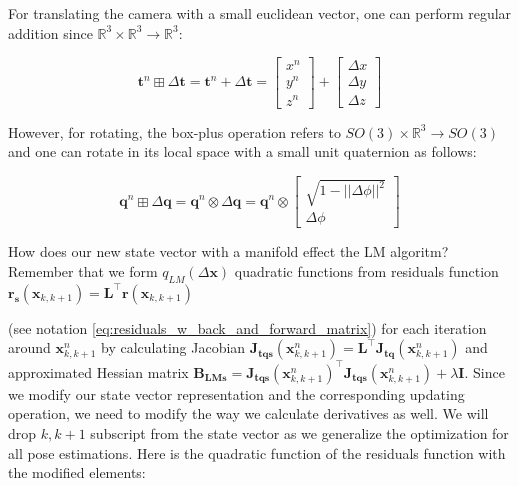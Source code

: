 \documentclass[a4paper]{report}
\numberwithin{figure}{section}
\newcommand{\R}{\mathbb{R}}
\begin{document}
\begin{appendices}
For translating the camera with a small euclidean vector, 
one can perform regular addition since $\R^3 \times \R^3 \rightarrow \R^3$:

\begin{equation}
  \mathbf{t}^n \boxplus \Delta \mathbf{t} = 
  \mathbf{t}^n + \Delta \mathbf{t} =
  \begin{bmatrix} x^{n} \\ y^{n} \\ z^{n} \end{bmatrix} + 
  \begin{bmatrix} \Delta x \\ \Delta y \\ \Delta z \end{bmatrix}
\end{equation}

However, for rotating, the box-plus operation refers to 
$SO(3) \times \R^3 \rightarrow SO(3)$ and one can rotate in its local space 
with a small unit quaternion as follows:

\begin{equation}
  \mathbf{q}^n \boxplus \Delta \mathbf{q} = 
  \mathbf{q}^n \otimes \Delta \mathbf{q} = 
  \mathbf{q}^n \otimes 
  \begin{bmatrix} \sqrt{1-||\Delta \phi||^2} \\ \Delta \phi \end{bmatrix}
\end{equation}

How does our new state vector with a manifold effect the LM algoritm? 
Remember that we form $q_{LM}(\Delta \mathbf{x})$ quadratic functions 
from residuals function 
$\mathbf{r_s}(\mathbf{x}_{k,k+1})=\mathbf{L}^\top\mathbf{r}(\mathbf{x}_{k,k+1})$
 
(see notation \eqref{eq:residuals_w_back_and_forward_matrix})
for each iteration around $\mathbf{x}^n_{k,k+1}$ by calculating Jacobian 
$\mathbf{J_{tqs}}(\mathbf{x}^n_{k,k+1})=\mathbf{L}^\top\mathbf{J_{tq}}(\mathbf{x}^n_{k,k+1})$
and 
approximated Hessian matrix 
$\mathbf{B_{LMs}}=\mathbf{J_{tqs}}(\mathbf{x}^n_{k,k+1})^\top\mathbf{J_{tqs}}(\mathbf{x}^n_{k,k+1})
 + \lambda \mathbf{I}$.
Since we modify our state vector representation 
and the corresponding updating operation, we need to modify the way we calculate 
derivatives as well. We will drop $k,k+1$ subscript from the state vector 
as we generalize the 
optimization for all pose estimations. 
Here is the quadratic function of the residuals function with the modified elements:


\end{appendices}
\end{document}
